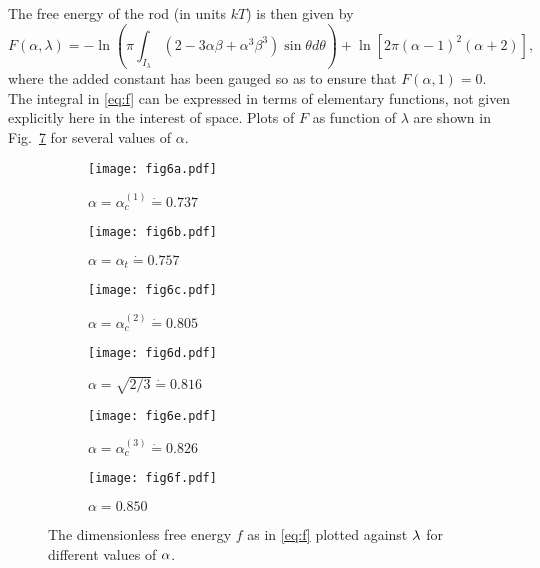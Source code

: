 \documentclass{article}
\begin{document}
The free energy of the rod (in units $kT$) is then given by 
\begin{equation}
F(\alpha ,\lambda)=-\ln \left( \pi \int_{I_{\lambda}}(2-3\alpha \beta
+\alpha ^{3}\beta ^{3})\sin \theta d\theta \right) +\ln [2\pi (\alpha
-1)^{2}(\alpha +2)],  \label{eq:f}
\end{equation}%
where the added constant has been gauged so as to ensure that $F(\alpha
,1)=0 $. The integral in \eqref{eq:f} can be expressed in terms of
elementary functions, not given explicitly here in the interest of space.
Plots of $F$ as function of $\lambda$ are shown in Fig.~\ref{fig:f_s} for
several values of $\alpha $. 
\begin{figure}[h]
\centering
\begin{subfigure}[c]{0.3\linewidth}
		\centering
		\texttt{[image: fig6a.pdf]}
		\caption{$\alpha=\alpha_c^{(1)}\dot{=}0.737$}
		\label{fig:f_1}
	\end{subfigure}
\quad 
\begin{subfigure}[c]{0.3\linewidth}
		\centering
		\texttt{[image: fig6b.pdf]}
		\caption{$\alpha=\alpha_t\dot{=}0.757$}
		\label{fig:f_2}
	\end{subfigure}
\quad 
\begin{subfigure}[c]{0.3\linewidth}
		\centering
		\texttt{[image: fig6c.pdf]}
		\caption{$\alpha=\alpha_c^{(2)}\dot{=}0.805$}
		\label{fig:f_3}
	\end{subfigure}
\newline
\begin{subfigure}[c]{0.3\linewidth}
		\centering
		\texttt{[image: fig6d.pdf]}
		\caption{$\alpha=\sqrt{2/3}\dot{=}0.816$}
		\label{fig:f_4}
	\end{subfigure}
\quad 
\begin{subfigure}[c]{0.3\linewidth}
		\centering
		\texttt{[image: fig6e.pdf]}
		\caption{$\alpha=\alpha_c^{(3)}\dot{=}0.826$}
		\label{fig:f_5}
	\end{subfigure}
\quad 
\begin{subfigure}[c]{0.3\linewidth}
		\centering
		\texttt{[image: fig6f.pdf]}
		\caption{$\alpha=0.850$}
		\label{fig:f_6}
	\end{subfigure}
\caption{The dimensionless free energy $f$ as in \eqref{eq:f} plotted
against $\protect\lambda $ for different values of $\protect\alpha $.}
\label{fig:f_s}
\end{figure}
\end{document}
